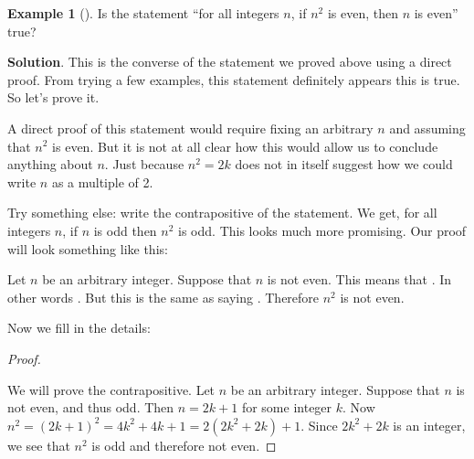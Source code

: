 \documentclass[10pt,]{book}
\theoremstyle{plain}
\theoremstyle{definition}
\theoremstyle{definition}
\newtheorem{example}[theorem]{Example}
\theoremstyle{definition}
\theoremstyle{definition}
\numberwithin{equation}{chapter}
\begin{document}
\begin{example}[]\label{example-66}
\hypertarget{p-2058}{}%
Is the statement ``for all integers \(n\), if \(n^2\) is even, then \(n\) is even'' true?%
\par\smallskip%
\noindent\textbf{Solution}.\hypertarget{solution-183}{}\quad%
\hypertarget{p-2059}{}%
This is the converse of the statement we proved above using a direct proof. From trying a few examples, this statement definitely appears this is true. So let's prove it.%
\par
\hypertarget{p-2060}{}%
A direct proof of this statement would require fixing an arbitrary \(n\) and assuming that \(n^2\) is even. But it is not at all clear how this would allow us to conclude anything about \(n\). Just because \(n^2 = 2k\) does not in itself suggest how we could write \(n\) as a multiple of 2.%
\par
\hypertarget{p-2061}{}%
Try something else: write the contrapositive of the statement. We get, for all integers \(n\), if \(n\) is odd then \(n^2\) is odd. This looks much more promising. Our proof will look something like this:%
\par
\hypertarget{p-2062}{}%
Let \(n\) be an arbitrary integer. Suppose that \(n\) is not even. This means that \textellipsis{}. In other words \textellipsis{}. But this is the same as saying \textellipsis{}. Therefore \(n^2\) is not even.%
\par
\hypertarget{p-2063}{}%
Now we fill in the details:%
\begin{proof}\hypertarget{proof-23}{}
\hypertarget{p-2064}{}%
We will prove the contrapositive. Let \(n\) be an arbitrary integer. Suppose that \(n\) is not even, and thus odd. Then \(n= 2k+1\) for some integer \(k\). Now \(n^2 = (2k+1)^2 = 4k^2 + 4k + 1 = 2(2k^2 + 2k) + 1\). Since \(2k^2 + 2k\) is an integer, we see that \(n^2\) is odd and therefore not even.%
\end{proof}
\end{example}
\end{document}
